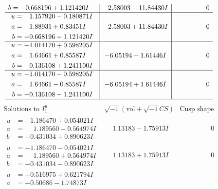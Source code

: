 \documentclass[1p]{elsarticle_modified}
\theoremstyle{definition}
\newcommand{\I}{\sqrt{-1}}
\begin{document}
$$\begin{array}{c|c|c}
\begin{aligned}
b &= -0.668196 + 1.121420 I\end{aligned}
 & \phantom{-}2.58003 - 11.84430 I & \phantom{-0.000000 } 0 \\ \hline\begin{aligned}
u &= \phantom{-}1.157920 - 0.180871 I \\
a &= \phantom{-}1.88931 + 0.83451 I \\
b &= -0.668196 - 1.121420 I\end{aligned}
 & \phantom{-}2.58003 + 11.84430 I & \phantom{-0.000000 } 0 \\ \hline\begin{aligned}
u &= -1.014170 + 0.598205 I \\
a &= \phantom{-}1.64661 + 0.85587 I \\
b &= -0.136108 + 1.241100 I\end{aligned}
 & -6.05194 - 1.61446 I & \phantom{-0.000000 } 0 \\ \hline\begin{aligned}
u &= -1.014170 - 0.598205 I \\
a &= \phantom{-}1.64661 - 0.85587 I \\
b &= -0.136108 - 1.241100 I\end{aligned}
 & -6.05194 + 1.61446 I & \phantom{-0.000000 } 0\\
 \hline 
 \end{array}$$\newpage$$\begin{array}{c|c|c}  
\text{Solutions to }I^u_{1}& \I (\text{vol} + \sqrt{-1}CS) & \text{Cusp shape}\\
 \hline 
\begin{aligned}
u &= -1.186470 + 0.054021 I \\
a &= \phantom{-}1.189560 - 0.564974 I \\
b &= -0.431034 + 0.890623 I\end{aligned}
 & \phantom{-}1.13183 - 1.75913 I & \phantom{-0.000000 } 0 \\ \hline\begin{aligned}
u &= -1.186470 - 0.054021 I \\
a &= \phantom{-}1.189560 + 0.564974 I \\
b &= -0.431034 - 0.890623 I\end{aligned}
 & \phantom{-}1.13183 + 1.75913 I & \phantom{-0.000000 } 0 \\ \hline\begin{aligned}
u &= -0.516975 + 0.621794 I \\
a &= -0.50686 - 1.74873 I \\

\end{aligned}
\end{array}$$
\end{document}
